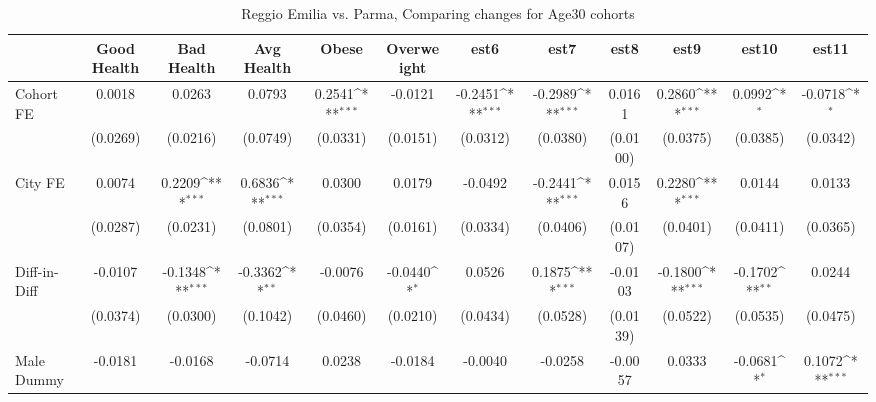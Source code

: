 \begin{table}[htbp]\centering
\def\sym#1{\ifmmode^{#1}\else\(^{#1}\)\fi}
\caption{Reggio Emilia vs. Parma, Comparing changes for Age30 cohorts}
\begin{tabular}{l*{11}{c}}
\toprule
            &\multicolumn{1}{c}{Good Health}&\multicolumn{1}{c}{Bad Health}&\multicolumn{1}{c}{Avg Health}&\multicolumn{1}{c}{Obese}&\multicolumn{1}{c}{Overweight}&\multicolumn{1}{c}{est6}&\multicolumn{1}{c}{est7}&\multicolumn{1}{c}{est8}&\multicolumn{1}{c}{est9}&\multicolumn{1}{c}{est10}&\multicolumn{1}{c}{est11}\\
\midrule
Cohort FE   &      0.0018         &      0.0263         &      0.0793         &      0.2541\sym{***}&     -0.0121         &     -0.2451\sym{***}&     -0.2989\sym{***}&      0.0161         &      0.2860\sym{***}&      0.0992\sym{*}  &     -0.0718\sym{*}  \\
            &    (0.0269)         &    (0.0216)         &    (0.0749)         &    (0.0331)         &    (0.0151)         &    (0.0312)         &    (0.0380)         &    (0.0100)         &    (0.0375)         &    (0.0385)         &    (0.0342)         \\
\addlinespace
City FE     &      0.0074         &      0.2209\sym{***}&      0.6836\sym{***}&      0.0300         &      0.0179         &     -0.0492         &     -0.2441\sym{***}&      0.0156         &      0.2280\sym{***}&      0.0144         &      0.0133         \\
            &    (0.0287)         &    (0.0231)         &    (0.0801)         &    (0.0354)         &    (0.0161)         &    (0.0334)         &    (0.0406)         &    (0.0107)         &    (0.0401)         &    (0.0411)         &    (0.0365)         \\
\addlinespace
Diff-in-Diff&     -0.0107         &     -0.1348\sym{***}&     -0.3362\sym{**} &     -0.0076         &     -0.0440\sym{*}  &      0.0526         &      0.1875\sym{***}&     -0.0103         &     -0.1800\sym{***}&     -0.1702\sym{**} &      0.0244         \\
            &    (0.0374)         &    (0.0300)         &    (0.1042)         &    (0.0460)         &    (0.0210)         &    (0.0434)         &    (0.0528)         &    (0.0139)         &    (0.0522)         &    (0.0535)         &    (0.0475)         \\
\addlinespace
Male Dummy  &     -0.0181         &     -0.0168         &     -0.0714         &      0.0238         &     -0.0184         &     -0.0040         &     -0.0258         &     -0.0057         &      0.0333         &     -0.0681\sym{*}  &      0.1072\sym{***}\\

\end{tabular}
\end{table}
